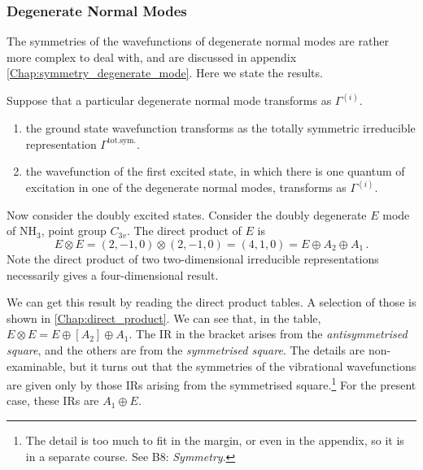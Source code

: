 \documentclass{article}
\theoremstyle{plain}\theoremheaderfont{\normalfont\itshape}\theorembodyfont{\rmfamily}\theoremseparator{.}\newtheorem*{rem}{Remark}\newtheorem*{ex}{Example}\newtheorem*{proof}{Proof}\newtheorem*{altp}{Alternative proof}
\theoremstyle{plain}\theoremheaderfont{\normalfont\bfseries}\theorembodyfont{\rmfamily}\theoremseparator{.}\newtheorem{thm}{Theorem}[section]\newtheorem{lem}[thm]{Lemma}\newtheorem{prop}[thm]{Proposition}\newtheorem*{cor}{Corollary}\newtheorem{defn}[thm]{Definition}\newtheorem{clm}[thm]{Claim}\newtheorem{clminproof}{Claim}\newtheorem{pos}{Postulate}[section]
\theoremstyle{break}\theoremheaderfont{\normalfont\itshape}\theorembodyfont{\rmfamily}\theoremseparator{.\medskip}\newtheorem*{proofskip}{Proof}\newtheorem*{exs}{Examples}\newtheorem*{rems}{Remarks}
\theoremstyle{break}\theoremheaderfont{\normalfont\bfseries}\theorembodyfont{\rmfamily}\theoremseparator{.\medskip}\newtheorem{lemskip}[thm]{Lemma}\newtheorem{defnskip}[thm]{Definition}\newtheorem{propskip}[thm]{Proposition}\newtheorem{thmskip}[thm]{Theorem}
\numberwithin{equation}{section}
\begin{document}

    \subsubsection{Degenerate Normal Modes}
    The symmetries of the wavefunctions of degenerate normal modes are rather more complex to deal with, and are discussed in appendix \cref{Chap:symmetry_degenerate_mode}. Here we state the results.

    Suppose that a particular degenerate normal mode transforms as \(\Gamma^{(i)}\).
    \begin{enumerate}[topsep=0pt,label=(\roman*)]
        \item the ground state wavefunction transforms as the totally symmetric irreducible representation \(\Gamma^{\text{tot.sym.}}\).
        \item the wavefunction of the first excited state, in which there is one quantum of excitation in one of the degenerate normal modes, transforms as \(\Gamma^{(i)}\).
    \end{enumerate}

    Now consider the doubly excited states. Consider the doubly degenerate \(E\) mode of \(\mathrm{NH_3}\), point group \(C_{3v}\). The direct product of \(E\) is
    \begin{equation}
        E\otimes E=(2,-1,0)\otimes(2,-1,0)=(4,1,0)=E\oplus A_2\oplus A_1\,.
    \end{equation}
    Note the direct product of two two-dimensional irreducible representations necessarily gives a four-dimensional result.

    We can get this result by reading the direct product tables. A selection of those is shown in \cref{Chap:direct_product}. We can see that, in the table, \(E\otimes E=E\oplus [A_2]\oplus A_1\). The IR in the bracket arises from the \textit{antisymmetrised square}, and the others are from the \textit{symmetrised square}. The details are non-examinable, but it turns out that the symmetries of the vibrational wavefunctions are given only by those IRs arising from the symmetrised square.\footnote{The detail is too much to fit in the margin, or even in the appendix, so it is in a separate course. See B8: \textit{Symmetry}.} For the present case, these IRs are \(A_1\oplus E\).
\end{document}
